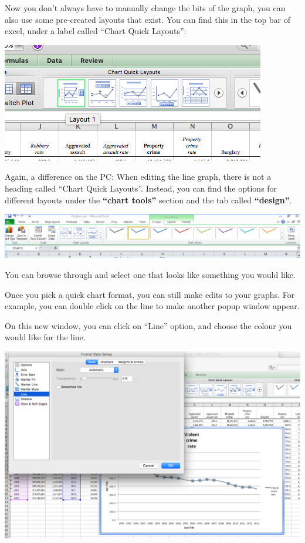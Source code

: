 \documentclass[
]{book}
\begin{document}
Now you don't always have to manually change the bits of the graph, you can also use some pre-created layouts that exist. You can find this in the top bar of excel, under a label called ``Chart Quick Layouts'':

\includegraphics{imgs/desc_line_layout.png}

Again, a difference on the PC: When editing the line graph, there is not a heading called ``Chart Quick Layouts''. Instead, you can find the options for different layouts under the \textbf{``chart tools''} section and the tab called \textbf{``design''}.

\includegraphics{imgs/pc_chart_tools.png}

You can browse through and select one that looks like something you would like.

Once you pick a quick chart format, you can still make edits to your graphs. For example, you can double click on the line to make another popup window appear.

On this new window, you can click on ``Line'' option, and choose the colour you would like for the line.

\includegraphics{imgs/desc_line_edit.png}
\end{document}
